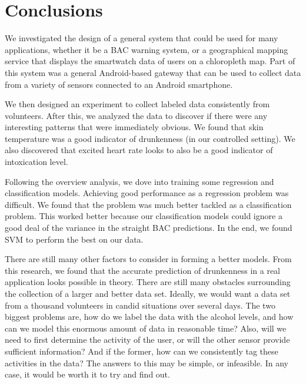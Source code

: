 \section{Conclusions}

We investigated the design of a general system that could be used for many applications, whether it be a BAC warning system, or a geographical mapping service that displays the smartwatch data of users on a chloropleth map. Part of this system was a general Android-based gateway that can be used to collect data from a variety of sensors connected to an Android smartphone.

We then designed an experiment to collect labeled data consistently from volunteers. After this, we analyzed the data to discover if there were any interesting patterns that were immediately obvious. We found that skin temperature was a good indicator of drunkenness (in our controlled setting). We also discovered that excited heart rate looks to also be a good indicator of intoxication level.

Following the overview analysis, we dove into training some regression and classification models. Achieving good performance as a regression problem was difficult. We found that the problem was much better tackled as a classification problem. This worked better because our classification models could ignore a good deal of the variance in the straight BAC predictions. In the end, we found SVM to perform the best on our data.

There are still many other factors to consider in forming a better models. From this research, we found that the accurate prediction of drunkenness in a real application looks possible in theory. There are still many obstacles surrounding the collection of a larger and better data set. Ideally, we would want a data set from a thousand volunteers in candid situations over several days. The two biggest problems are, how do we label the data with the alcohol levels, and how can we model this enormous amount of data in reasonable time? Also, will we need to first determine the activity of the user, or will the other sensor provide sufficient information? And if the former, how can we consistently tag these activities in the data? The answers to this may be simple, or infeasible. In any case, it would be worth it to try and find out.